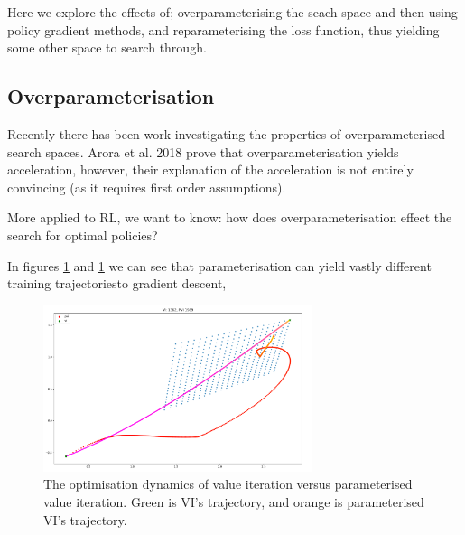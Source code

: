 Here we explore the effects of; overparameterising the seach space and then using policy gradient methods,
and reparameterising the loss function, thus yielding some other space to search through.




\subsection{Overparameterisation}

Recently there has been work investigating the properties of overparameterised search spaces.
Arora et al. 2018 \cite{Arora2018} prove that overparameterisation yields acceleration, however,
their explanation of the acceleration is not entirely convincing (as it requires first order assumptions).

More applied to RL, we want to know: how does overparameterisation effect the search for optimal policies?

In figures \ref{param-compare-sgd} and \ref{param-compare-sgd} we can see that
parameterisation can yield vastly different training trajectories\footnotemark to gradient descent,


\begin{figure}[h!]
\centering
\includegraphics[width=0.7\textwidth,height=0.35\textheight]{../../pictures/figures/vi-pvi-0.png}
\caption{The optimisation dynamics of value iteration versus parameterised value iteration.
Green is VI's trajectory, and orange is parameterised VI's trajectory.}
\label{param-compare-sgd}
\end{figure}

